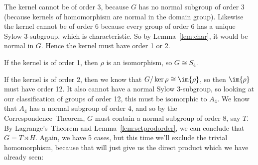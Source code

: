 The kernel cannot be of order 3, because \(G\) has no normal subgroup of order 3 (because kernels of homomorphism are
normal in the domain group).
Likewise the kernel cannot be of order 6 because every group of order 6 has a unique Sylow 3-subgroup, which is
characteristic.
So by Lemma~\ref{lem:char}, it would be normal in \(G\).
Hence the kernel must have order 1 or 2.

If the kernel is of order 1, then \(\rho\) is an isomorphism, so \(G \cong S_4\).

If the kernel is of order 2, then we know that \(G/\ker{\rho} \cong \im{\rho}\), so then \(\im{\rho}\) must have order
12.
It also cannot have a normal Sylow 3-subgroup, so looking at our classification of groups of order 12, this must be
isomorphic to \(A_4\).
We know that \(A_4\) has a normal subgroup of order 4, and so by the Correspondence~Theorem, \(G\) must contain a normal
subgroup of order 8, say \(T\).
By Lagrange's~Theorem and Lemma~\ref{lem:setprodorder}, we can conclude that \(G = T \rtimes H\).
Again, we have 5 cases, but this time we'll exclude the trivial homomorphism, because that will just give us the direct
product which we have already seen:


